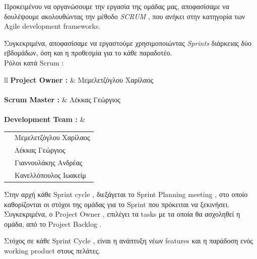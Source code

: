 \documentclass{../ol-softwaremanual}
\begin{document}
	\newpage
	
	\flushleft
	Προκειμένου να οργανώσουμε την εργασία της ομάδας μας, αποφασίσαμε να δουλέψουμε ακολουθώντας την μέθοδο \en \textit{SCRUM} \gr , που ανήκει στην κατηγορία των \en Agile development frameworks. \gr
	
	Συγκεκριμένα, αποφασίσαμε να εργαστούμε χρησιμοποιώντας \en \textit{Sprints} \gr διάρκειας δύο εβδομάδων, όση και η προθεσμία για το κάθε παραδοτέο. \\ 
	
	Ρόλοι κατά \en Scrum \gr : \newline
	
	
	\flushleft
	\begin{tabular}{ll}
		\en \textbf{Project Owner : }  & \gr \hspace{5mm}  Μεμελετζόγλου Χαρίλαος \\
		\\ \en \textbf{Scrum Master : } &  \gr \hspace{5mm} Λέκκας Γεώργιος \\
		
		\\ \en \textbf{Development Team : } & \begin{tabular}[t]{ll}
			&  \gr  Μεμελετζόγλου Χαρίλαος  \\
			& \gr     Λέκκας Γεώργιος \\
			& \gr     Γιαννουλάκης Ανδρέας \\
			& \gr     Κανελλόπουλος Ιωακείμ \\
		\end{tabular} 
	\end{tabular} \linebreak
	
	\vspace{20pt}
	
	Στην αρχή κάθε \en Sprint cycle \gr , διεξάγεται το \en Sprint Planning meeting \gr , στο οποίο καθορίζονται οι στόχοι της ομάδας για το \en Sprint \gr που πρόκειται να ξεκινήσει. Συγκεκριμένα, ο \en Project Owner \gr , επιλέγει τα \en tasks \gr με τα οποία θα ασχοληθεί η ομάδα, από το \en Project Backlog \gr . \\
	
	\vspace{5pt}
	
	Στόχος σε κάθε \en Sprint Cycle \gr , είναι η ανάπτυξη νέων \en features \gr και η παράδοση ενός \en working product \gr στους πελάτες. \\ 
	
\end{document}
